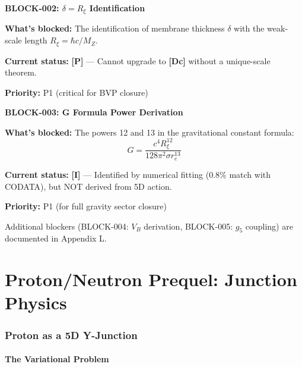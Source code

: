 \documentclass[11pt,a4paper]{article}
\newcommand{\tagP}{\textcolor{red!70!black}{\textbf{[P]}}}
\newcommand{\tagI}{\textcolor{orange!80!black}{\textbf{[I]}}}
\newcommand{\tagDc}{\textcolor{blue!70!black}{\textbf{[Dc]}}}
\begin{document}
\begin{warnbox}
\textbf{BLOCK-002: $\delta = R_\xi$ Identification}

\textbf{What's blocked:} The identification of membrane thickness $\delta$ with the weak-scale length $R_\xi = \hbar c / M_Z$.

\textbf{Current status:} \tagP{} --- Cannot upgrade to \tagDc{} without a unique-scale theorem.

\textbf{Priority:} P1 (critical for BVP closure)
\end{warnbox}

\begin{warnbox}
\textbf{BLOCK-003: G Formula Power Derivation}

\textbf{What's blocked:} The powers 12 and 13 in the gravitational constant formula:
\begin{equation}
    G = \frac{c^4 R_\xi^{12}}{128\pi^2 \sigma r_e^{13}}
\end{equation}

\textbf{Current status:} \tagI{} --- Identified by numerical fitting (0.8\% match with CODATA), but NOT derived from 5D action.

\textbf{Priority:} P1 (for full gravity sector closure)
\end{warnbox}

Additional blockers (BLOCK-004: $V_B$ derivation, BLOCK-005: $g_5$ coupling) are documented in Appendix L.

\newpage


\part{Proton/Neutron Prequel: Junction Physics}

\section{Proton as a 5D Y-Junction}
\label{sec:proton_junction}

\subsection{The Variational Problem}
\end{document}
